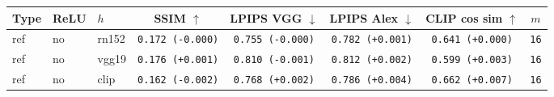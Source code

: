 \begin{tabular}{|l|l|l|c|c|c|c|c|}
\hline
Type & ReLU & $h$ & SSIM $\uparrow$ & LPIPS VGG $\downarrow$ & LPIPS Alex $\downarrow$ & CLIP cos sim $\uparrow$ & $m$ \\
\hline
ref & no & rn152 & \texttt{0.172 {\color{black}(-0.000)}} & \texttt{0.755 {\color{black}(-0.000)}} & \texttt{0.782 {\color{red}(+0.001)}} & \texttt{0.641 {\color{black}(+0.000)}} & \texttt{16} \\
\hline
ref & no & vgg19 & \texttt{0.176 {\color{green}(+0.001)}} & \texttt{0.810 {\color{green}(-0.001)}} & \texttt{0.812 {\color{red}(+0.002)}} & \texttt{0.599 {\color{green}(+0.003)}} & \texttt{16} \\
\hline
ref & no & clip & \texttt{0.162 {\color{red}(-0.002)}} & \texttt{0.768 {\color{red}(+0.002)}} & \texttt{0.786 {\color{red}(+0.004)}} & \texttt{0.662 {\color{green}(+0.007)}} & \texttt{16} \\
\hline
\end{tabular}
